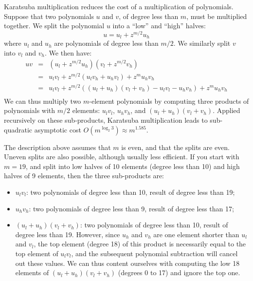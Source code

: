 \documentclass{llncs}
\begin{document}
Karatsuba multiplication\cite{KarOfm1962} reduces the cost of a
multiplication of polynomials. Suppose that two polynomials $u$ and $v$,
of degree less than $m$, must be multiplied together. We split the
polynomial $u$ into a ``low'' and ``high'' halves:
\begin{equation*}
    u = u_l + z^{m/2} u_h
\end{equation*}
where $u_l$ and $u_h$ are polynomials of degree less than $m/2$. We
similarly split $v$ into $v_l$ and $v_h$. We then have:
\begin{eqnarray*}
    uv &=& (u_l + z^{m/2} u_h) (v_l + z^{m/2} v_h) \\
       &=& u_l v_l + z^{m/2} (u_l v_h + u_h v_l) + z^m u_h v_h \\
       &=& u_l v_l + z^{m/2} ((u_l + u_h) (v_l + v_h) - u_l v_l - u_h v_h) + z^m u_h v_h \\
\end{eqnarray*}
We can thus multiply two $m$-element polynomials by computing three
products of polynomials with $m/2$ elements: $u_l v_l$, $u_h v_h$, and
$(u_l+u_h)(v_l+v_h)$. Applied recursively on these sub-products,
Karatsuba multiplication leads to sub-quadratic asymptotic cost
$O(m^{\log_2 3}) \approx m^{1.585}$.

The description above assumes that $m$ is even, and that the splits are
even. Uneven splits are also possible, although usually less efficient.
If you start with $m = 19$, and split into low halves of 10 elements
(degree less than 10) and high halves of 9 elements, then the three
sub-products are:
\begin{itemize}

    \item $u_l v_l$: two polynomials of degree less than 10, result of
    degree less than 19;
    \item $u_h v_h$: two polynomials of degree less than 9, result of
    degree less than 17;
    \item $(u_l+u_h)(v_l+v_h)$: two polynomials of degree less than 10,
    result of degree less than 19. However, since $u_h$ and $v_h$ are
    one element shorter than $u_l$ and $v_l$, the top element (degree 18)
    of this product is necessarily equal to the top element of $u_l v_l$,
    and the subsequent polynomial subtraction will cancel out these values.
    We can thus content ourselves with computing the low 18 elements of
    $(u_l+u_h)(v_l+v_h)$ (degrees 0 to 17) and ignore the top one.

\end{itemize}
\end{document}
